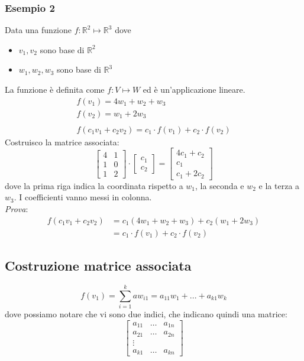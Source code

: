 \documentclass[italian]{article}
\newcommand{\ins}[1]{\text{$\mathbb{#1}$}}
\begin{document}
\subsubsection{Esempio 2}
Data una funzione $f: \ins{R}^2 \longmapsto \ins{R}^3$ dove
\begin{itemize}
	\item $v_1,v_2$ sono base di $\ins{R}^2$
	\item $w_1,w_2,w_3$ sono base di $\ins{R}^3$
\end{itemize}
La funzione è definita come $f: V \longmapsto W$ ed è un'applicazione lineare.
\begin{gather*}
	f(v_1) = 4w_1 + w_2 + w_3 \\
	f(v_2) = w_1 + 2w_3\\\\
	f(c_1v_1 + c_2v_2) = c_1 \cdot f(v_1) + c_2 \cdot f(v_2)
\end{gather*}
Costruisco la matrice associata:
\[
	\begin{bmatrix}
		4 & 1 \\
		1 & 0 \\
		1 & 2
	\end{bmatrix}
	\cdot
	\begin{bmatrix}
	c_1 \\ c_2
	\end{bmatrix}
	=
	\begin{bmatrix}
		4c_1 + c_2 \\
		c_1 \\
		c_1 + 2c_2
	\end{bmatrix}
\]
dove la prima riga indica la coordinata rispetto a $w_1$, la seconda e $w_2$ e la terza a $w_3$. I coefficienti vanno messi in colonna.\\[3mm]
\textit{Prova}:
\[
	\begin{split}
		f(c_1v_1 + c_2v_2) &= c_1(4w_1 + w_2 + w_3) + c_2(w_1 + 2w_3)\\
		&= c_1 \cdot f(v_1) + c_2 \cdot f(v_2)
	\end{split}
\]

\newpage
\noindent
\subsection{Costruzione matrice associata}
\[
	f(v_1) = \sum_{i=1}^{k}aw_{i1} = a_{11}w_ 1 + ... + a_{k1}w_k
\]
dove possiamo notare che vi sono due indici, che indicano quindi una matrice:
\[
	\begin{bmatrix}
		a_{11} & \dots & a_{1n} \\
		a_{21} & \dots & a_{2n} \\
		\vdots & & \\
		a_{k1} & \dots & a_{kn}
	\end{bmatrix}
\]
\end{document}
